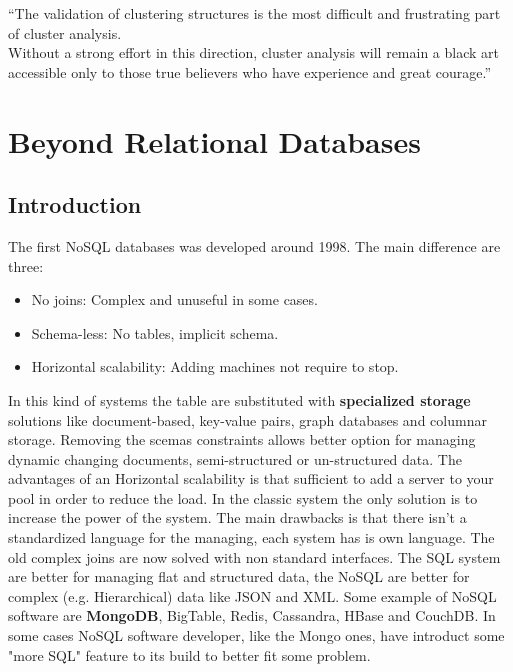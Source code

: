\documentclass[12pt]{article}
\begin{document}
\bigskip
``The validation of clustering structures is the most difficult and frustrating part of cluster analysis.\\
Without a strong effort in this direction, cluster analysis will remain a black art accessible only to those true believers who have experience and great courage.''\\


\clearpage
\section{Beyond Relational Databases}
\subsection{Introduction}
The first NoSQL databases was developed around 1998. The main difference are three:
\begin{itemize}
  \item No joins: Complex and unuseful in some cases.
  \item Schema-less: No tables, implicit schema.
  \item Horizontal scalability: Adding machines not require to stop.
\end{itemize}
In this kind of systems the table are substituted with \textbf{specialized storage} solutions like document-based, key-value pairs, graph databases and columnar storage. Removing the scemas constraints allows better option for managing dynamic changing documents, semi-structured or un-structured data. The advantages of an Horizontal scalability is that sufficient to add a server to your pool in order to reduce the load. In the classic system the only solution is to increase the power of the system. The main drawbacks is that there isn't a standardized language for the managing, each system has is own language. The old complex joins are now solved with non standard interfaces. The SQL system are better for managing flat and structured data, the NoSQL are better for complex (e.g. Hierarchical) data like JSON and XML. Some example of NoSQL software are \textbf{MongoDB}, BigTable, Redis, Cassandra, HBase and CouchDB. In some cases NoSQL software developer, like the Mongo ones, have introduct some "more SQL" feature to its build to better fit some problem.
\end{document}
